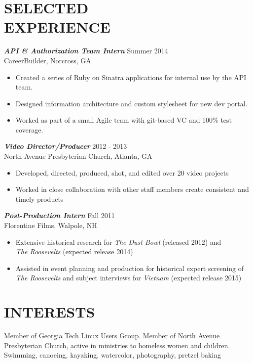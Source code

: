 \documentclass[margin]{res}
\begin{document}
\begin{resume}
\section{SELECTED \\ EXPERIENCE}
                {\sl \textbf{API \& Authorization Team Intern}} \hfill Summer 2014 \\
                    CareerBuilder, Norcross, GA
                 \begin{itemize}  \itemsep -2pt %
                 \item Created a series of Ruby on Sinatra applications for internal use by the API team.
                 \item Designed information architecture and custom stylesheet for new dev portal.
                 \item Worked as part of a small Agile team with git-based VC and 100\% test coverage.
                \end{itemize}

                {\sl \textbf{Video Director/Producer}} \hfill            2012 - 2013 \\
                 North Avenue Presbyterian Church, Atlanta, GA
                 \begin{itemize}  \itemsep -2pt %
                 \item Developed, directed, produced, shot, and edited over 20 video projects
                 \item Worked in close collaboration with other staff members create consistent and timely products
                 \end{itemize}

                {\sl \textbf{Post-Production Intern}} \hfill       Fall 2011 \\
                Florentine Films, Walpole, NH
                  \begin{itemize}  \itemsep -2pt
                   \item Extensive historical research for {\sl The Dust Bowl} (released
                   2012) and\\ {\sl The Roosevelts} (expected release 2014)
                   \item Assisted in event planning and production for historical expert
                   screening of\\ {\sl The Roosevelts} and subject interviews for {\sl Vietnam} (expected release 2015)
                   \end{itemize}

\section{INTERESTS}  Member of Georgia Tech Linux Users Group. Member of North Avenue Presbyterian Church,
                    active in ministries to homeless women and children. \\Swimming, canoeing, kayaking, watercolor, photography, pretzel baking\\


\end{resume}
\end{document}

